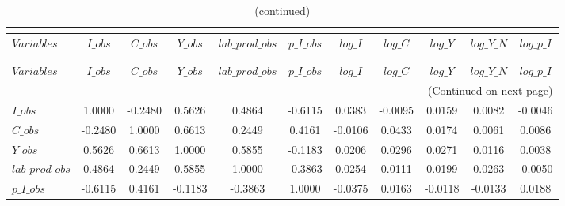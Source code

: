  
\begin{center}
\begin{longtable}{lcccccccccc} 
\caption{MATRIX OF CORRELATIONS}\\
 \label{Table:th_corr_matrix}\\
\toprule 
$Variables       $	 & 	 $           I\_obs$	 & 	 $           C\_obs$	 & 	 $           Y\_obs$	 & 	 $  lab\_prod\_obs$	 & 	 $       p\_I\_obs$	 & 	 $           log\_I$	 & 	 $           log\_C$	 & 	 $           log\_Y$	 & 	 $       log\_Y\_N$	 & 	 $       log\_p\_I$\\
\midrule \endfirsthead 
\caption{(continued)}\\
 \toprule \\ 
$Variables       $	 & 	 $           I\_obs$	 & 	 $           C\_obs$	 & 	 $           Y\_obs$	 & 	 $  lab\_prod\_obs$	 & 	 $       p\_I\_obs$	 & 	 $           log\_I$	 & 	 $           log\_C$	 & 	 $           log\_Y$	 & 	 $       log\_Y\_N$	 & 	 $       log\_p\_I$\\
\midrule \endhead 
\midrule \multicolumn{11}{r}{(Continued on next page)} \\ \bottomrule \endfoot 
\bottomrule \endlastfoot 
$I\_obs          $	 & 	            1.0000	 & 	           -0.2480	 & 	            0.5626	 & 	            0.4864	 & 	           -0.6115	 & 	            0.0383	 & 	           -0.0095	 & 	            0.0159	 & 	            0.0082	 & 	           -0.0046 \\ 
$C\_obs          $	 & 	           -0.2480	 & 	            1.0000	 & 	            0.6613	 & 	            0.2449	 & 	            0.4161	 & 	           -0.0106	 & 	            0.0433	 & 	            0.0174	 & 	            0.0061	 & 	            0.0086 \\ 
$Y\_obs          $	 & 	            0.5626	 & 	            0.6613	 & 	            1.0000	 & 	            0.5855	 & 	           -0.1183	 & 	            0.0206	 & 	            0.0296	 & 	            0.0271	 & 	            0.0116	 & 	            0.0038 \\ 
$lab\_prod\_obs  $	 & 	            0.4864	 & 	            0.2449	 & 	            0.5855	 & 	            1.0000	 & 	           -0.3863	 & 	            0.0254	 & 	            0.0111	 & 	            0.0199	 & 	            0.0263	 & 	           -0.0050 \\ 
$p\_I\_obs       $	 & 	           -0.6115	 & 	            0.4161	 & 	           -0.1183	 & 	           -0.3863	 & 	            1.0000	 & 	           -0.0375	 & 	            0.0163	 & 	           -0.0118	 & 	           -0.0133	 & 	            0.0188 \\ 

\end{longtable}
\end{center}
